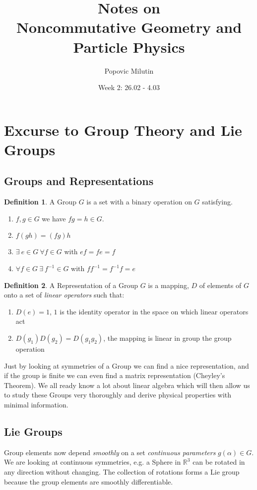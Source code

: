 \documentclass[a4paper]{article}
\title{Notes on \\ Noncommutative Geometry and Particle Physics}
\author{Popovic Milutin}
\date{Week 2: 26.02 - 4.03}
\theoremstyle{definition}
\newtheorem{definition}{Definition}
\theoremstyle{definition}
\theoremstyle{definition}
\theoremstyle{theorem}
\theoremstyle{theorem}
\theoremstyle{theorem}
\theoremstyle{definition}
\begin{document}
\maketitle
\tableofcontents
\section{Excurse to Group Theory and Lie Groups}
\subsection{Groups and Representations}
    \begin{definition}
        A Group $G$ is a set with a binary operation on $G$ satisfying.
        \begin{enumerate}
        \item $f, g \in G$ we have $fg = h \in G$.
        \item $f(gh) = (fg) h$
        \item  $\exists\ e \in G\ \forall f\in G$ with $ef=fe=f$
        \item $\forall f \in G\ \exists\ f^{-1}\in G$ with $ff^{-1}=f^{-1}f=e$
        \end{enumerate}
    \end{definition}

    \begin{definition}
        A Representation of a Group $G$ is a mapping, $D$ of elements of $G$ onto a set of \textit{linear
        operators} such that:
        \begin{enumerate}
            \item $D(e) = 1$, $1$ is the identity operator in the space on which linear operators act
            \item $D(g_1)D(g_2) = D(g_1g_2)$, the mapping is linear in group the group operation
        \end{enumerate}
    \end{definition}

    Just by looking at symmetries of a Group we can find a nice representation, and if the group is finite we
    can even find a matrix representation (Cheyley's Theorem). We all ready know a lot about linear algebra
    which will then allow us to study these Groups very thoroughly and derive physical properties with
    minimal information.


\subsection{Lie Groups}
    Group elements now depend \textit{smoothly} on a set \textit{continuous parameters} $g(\alpha) \in G$.
    We are looking at continuous symmetries, e.g. a Sphere in $\mathbb{R}^3$ can be rotated in any direction
    without changing. The collection of rotations forms a Lie group because the group elements are smoothly
    differentiable.
\end{document}
